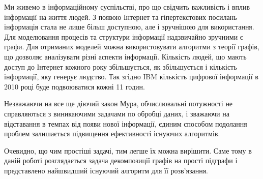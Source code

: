 Ми живемо в інформаційному суспільстві, про що свідчить важливість і вплив інформації на життя людей.
З появою Інтернет та гіпертекстових посилань інформація стала не лише більш доступною, але і зручнішою для використання.
Для моделювання процесів та структури інформації надзвичайно зручними є графи.
Для отриманих моделей можна використовувати алгоритми з теорії графів, що дозволяє аналізувати різні аспекти інформації.
Кількість людей, що мають доступ до Інтернет кожного року збільшується, як збільшується і кількість інформації, яку генерує людство.
Так згідно IBM\cite{web:ibm_soft_boost} кількість цифрової інформації в 2010 році буде подвоюватися кожні 11 годин.

Незважаючи на все ще діючий закон Мура, обчислювальні потужності не справляються з виникаючими задачами по обробці даних, і зважаючи на відставання в темпах від появи нової інформації, єдиним способом подолання проблем залишається підвищення ефективності існуючих алгоритмів.

Очевидно, що чим простіші задачі, тим легше їх можна вирішити.
Саме тому в даній роботі розглядається задача декомпозиції графів на прості підграфи і представлено найшвидший існуючий алгоритм для її розв'язання. 
